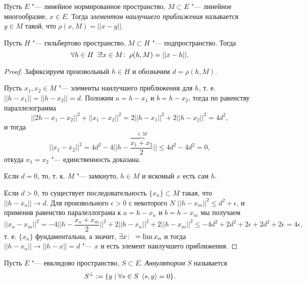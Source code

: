 \documentclass[main]{subfiles}
\begin{document}
\begin{definition}
  Пусть \( E \) "--- линейное нормированное пространство,
  \( M \subset E \) "--- линейное многообразие,
  \( x \in E \). Тогда \emph{элементом наилучшего приближения} называется
  \( y \in M \) такой, что \( \rho(x, M) = ||x - y|| \).
\end{definition}

\begin{lemma}
  Пусть \( H \) "--- гильбертово пространство, \( M \subset H \) "---
  подпространство. Тогда
  \[ \forall {h \in H} \; \, \exists! x \in M \colon \: \rho(h, M) = ||x - h||. \]
\end{lemma}
\begin{proof}
  Зафиксируем произвольный \( h \in H \) и обозначим \( d = \rho(h, M) \).

  Пусть \( x_1, x_2 \in M \) "---
  элементы наилучшего приближения для \( h \),
  т. е.  \( ||h - x_1|| = ||h - x_2|| = d \).
  Положим \( a = h - x_1 \) и \( b = h - x_2 \),
  тогда по равенству параллелограмма
  \[ ||2h - x_1 - x_2||^2 + ||x_1 - x_2||^2 =
  2||h - x_1||^2 + 2 ||h - x_2||^2 = 4 d^2, \]
  и тогда
  \[ ||x_1 - x_2||^2 = 4d^2 - 4 ||h - \overbrace{\frac{x_1 + x_2}{2}}^{\in M}||
  \le 4d^2 - 4d^2 = 0, \]
  откуда \( x_1 = x_2 \) "--- единственность доказана.

  Если \( d = 0 \), то, т. к. \( M \) "--- замкнуто,
  \( h \in M \) и искомый \( x \) есть сам \( h \).

  Если \( d > 0 \), то существует последовательность
  \( \{ x_n \} \subset M \) такая, что
  \( ||h - x_n|| \to d \).  Для произвольного \( \epsilon > 0 \)
  с некоторого \( N \) \( ||h - x_m||^2 \le d^2 + \epsilon \),
  и применив равенство паралеллограма
  к \( a = h - x_n \) и \( b = h - x_m \) мы получаем
  \[
    ||x_n - x_m||^2 = -4 ||h - \frac{x_n + x_m}{2}||^2
    + 2 ||h - x_n||^2 + 2||h - x_m||^2 \le
    -4 d^2 + 2d^2 + 2\epsilon + 2d^2 + 2\epsilon =
    4 \epsilon,
  \]
  т. е. \( \{ x_n \} \) фундаментальна, а значит,
  \( \exists x \colon \: = \lim x_n \) и тогда
  \( ||h - x_n|| \to ||h - x|| = d \) "---
  \( x \) и есть элемент наилучшего приближения.
\end{proof}


\begin{definition}
  Пусть \( E \) "--- евклидово пространство, \( S \subset E \).
  \emph{Аннулятором} \( S \) называется
  \[ S^\perp := \{ y \mid \forall {s \in S} \; \, \langle s, y \rangle = 0 \}. \]
\end{definition}
\end{document}
